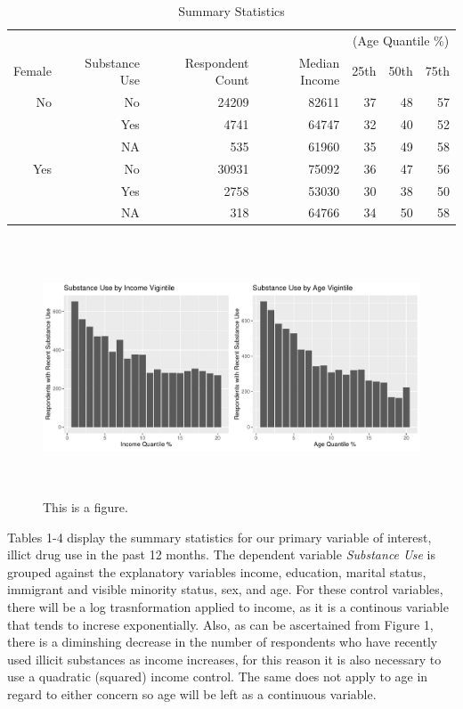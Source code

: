 \documentclass[11pt]{article}
\newcommand\T{\rule{0pt}{2.6ex}}       %
\begin{document}
{
\begin{table}[!htbp]
\caption{Summary Statistics}
\centering
\def\sym#1{\ifmmode^{#1}\else\(^{#1}\)\fi}
\begin{tabular}{rrrrrrr}
  \hline
  &&&&\multicolumn{3}{c}{(Age Quantile \%)}\\
 Female & Substance Use & Respondent Count & Median Income & 25th & 50th & 75th \\
  \hline
  \T
   No & No & 24209 & 82611 & 37 & 48 & 57 \\
    & Yes & 4741 & 64747 & 32 & 40 & 52 \\
    & NA & 535 & 61960 & 35 & 49 & 58 \\
  \midrule
   Yes & No & 30931 & 75092 & 36 & 47 & 56 \\
    & Yes & 2758 & 53030 & 30 & 38 & 50 \\
    & NA & 318 & 64766 & 34 & 50 & 58 \\
   \hline
\end{tabular}
\end{table}
}

\begin{figure}[!htbp]
\begin{center}
\includegraphics[height=3in,width=6in]{plots_final2}
\caption{This is a figure.}
\end{center}
\end{figure}

\vspace{10 mm}
Tables 1-4 display the summary statistics for our primary variable of interest, illict drug use in the past 12 months. The dependent variable \textit{Substance Use} is grouped against the explanatory variables income, education, marital status, immigrant and visible minority status, sex, and age. For these control variables, there will be a log trasnformation applied to income, as it is a continous variable that tends to increse exponentially. Also, as can be ascertained from Figure 1, there is a diminshing decrease in the number of respondents who have recently used illicit substances as income increases, for this reason it is also necessary to use a quadratic (squared) income control. The same does not apply to age in regard to either concern so age will be left as a continuous variable.
\end{document}
